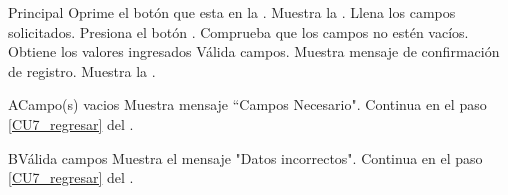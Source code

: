     \begin{UCtrayectoria}{Principal}
    \UCpaso[\UCactor]  Oprime el botón  que esta en la .
    \UCpaso Muestra la .
    \UCpaso[\UCactor] Llena los campos solicitados. \label{CU7_regresar}
    \UCpaso[\UCactor] Presiona el botón .
    \UCpaso Comprueba que los campos no estén vacíos. 
    \UCpaso Obtiene los valores ingresados
    \UCpaso Válida campos. 
    \UCpaso Muestra mensaje de confirmación de registro.
    \UCpaso Muestra la .
    \end{UCtrayectoria}
    
    \begin{UCtrayectoriaA}{A}{Campo(s) vacios}
    	\UCpaso Muestra mensaje “Campos Necesario".
    	\UCpaso Continua en el paso \ref{CU7_regresar} del .
    \end{UCtrayectoriaA}

	\begin{UCtrayectoriaA}{B}{Válida campos}
		\UCpaso Muestra el mensaje "Datos incorrectos".
   		\UCpaso Continua en el paso \ref{CU7_regresar} del .
	\end{UCtrayectoriaA}

	


